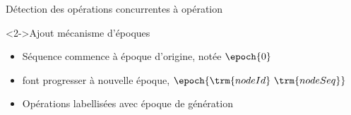 \begin{frame}[fragile]{Détection des opérations concurrentes à opération \ren}
\begin{figure}
{
        }
    \end{figure}
    \begin{block}<2->{Ajout mécanisme d'époques}
        \begin{itemize}
            \item<3-> Séquence commence à époque d'origine, notée $\epoch{0}$
            \item<4-> \ren font progresser à nouvelle époque, $\epoch{\trm{nodeId}~\trm{nodeSeq}}$
            \item<5-> Opérations labellisées avec époque de génération
        \end{itemize}
    \end{block}
\end{frame}

